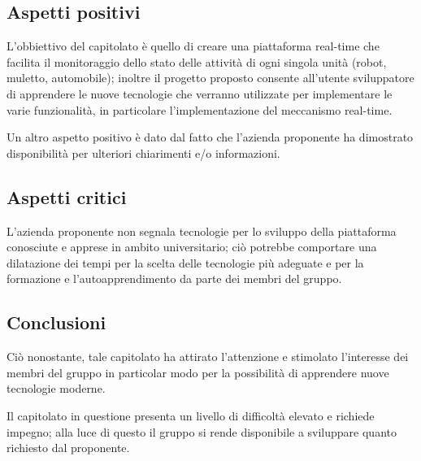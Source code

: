 \subsection{Aspetti positivi}
L'obbiettivo del capitolato è quello di creare una piattaforma real-time che facilita il monitoraggio dello stato delle attività di ogni singola unità (robot, muletto, automobile); inoltre il progetto proposto consente all'utente sviluppatore di apprendere le nuove tecnologie che verranno utilizzate per implementare le varie funzionalità, in particolare l'implementazione del meccanismo real-time.

Un altro aspetto positivo è dato dal fatto che l'azienda proponente ha dimostrato disponibilità per ulteriori chiarimenti e/o  informazioni.


\subsection{Aspetti critici}
L'azienda proponente non segnala tecnologie per lo sviluppo della piattaforma conosciute e apprese in ambito universitario; ciò potrebbe comportare una dilatazione dei tempi per la scelta delle tecnologie più adeguate e per la formazione e l'autoapprendimento da parte dei membri del gruppo.


\subsection{Conclusioni}
Ciò nonostante, tale capitolato ha attirato l'attenzione e stimolato l'interesse dei membri del gruppo in particolar modo per la possibilità di apprendere nuove tecnologie moderne.

Il capitolato in questione presenta un livello di difficoltà elevato e richiede impegno; alla luce di questo il gruppo si rende disponibile a sviluppare quanto richiesto dal proponente. 

